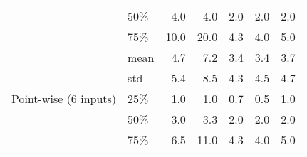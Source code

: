 \begin{table}[t]
\begin{tabular}{@{}llrrrrr}
	                                                  & 50\% &    4.0 &         4.0 &  2.0 &    2.0 &    2.0 \\
	                                                  & 75\% &   10.0 &        20.0 &  4.3 &    4.0 &    5.0 \\ \midrule
	\multirow{5}{*}{Point-wise (6 inputs)} & mean &    4.7 &         7.2 &  3.4 &    3.4 &    3.7 \\
	                                                  & std  &    5.4 &         8.5 &  4.3 &    4.5 &    4.7 \\
	                                                  & 25\% &    1.0 &         1.0 &  0.7 &    0.5 &    1.0 \\
	                                                  & 50\% &    3.0 &         3.3 &  2.0 &    2.0 &    2.0 \\
	                                                  & 75\% &    6.5 &        11.0 &  4.3 &    4.0 &    5.0 \\
	                                                   \bottomrule
\end{tabular}
\end{table}


